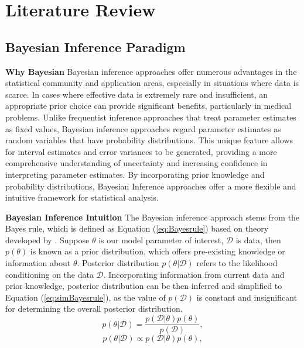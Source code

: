 \chapter{Literature Review}
\label{Chapter2}

\section{Bayesian Inference Paradigm}
\label{bayeisanP}
\textbf{Why Bayesian}
Bayesian inference approaches offer numerous advantages in the statistical community and application areas, especially in situations where data is scarce. In cases where effective data is extremely rare and insufficient, an appropriate prior choice can provide significant benefits, particularly in medical problems. Unlike frequentist inference approaches that treat parameter estimates as fixed values, Bayesian inference approaches regard parameter estimates as random variables that have probability distributions. This unique feature allows for interval estimates and error variances to be generated, providing a more comprehensive understanding of uncertainty and increasing confidence in interpreting parameter estimates. By incorporating prior knowledge and probability distributions, Bayesian Inference approaches offer a more flexible and intuitive framework for statistical analysis.

\textbf{Bayesian Inference Intuition}
The Bayesian inference approach stems from the Bayes rule, which is defined as Equation (\ref{eq:Bayesrule}) based on theory developed by \cite{Beech1959}. Suppose $\theta$ is our model parameter of interest, $\mathcal{D}$ is data, then $p(\theta)$ is known as a prior distribution, which offers pre-existing knowledge or information about $\theta$. Posterior distribution $p(\theta|\mathcal{D})$ refers to the likelihood conditioning on the data $\mathcal{D}$.
Incorporating information from current data and prior knowledge, posterior distribution can be then inferred and simplified to Equation (\ref{eq:simBayesrule}), as the value of $p(\mathcal{D})$ is constant and insignificant for determining the overall posterior distribution. 
\begin{equation}
	p(\theta|\mathcal{D}) = \frac{p(\mathcal{D}|\theta)p(\theta)}{p(\mathcal{D})},
	\label{eq:Bayesrule}
\end{equation}
\begin{equation}
	p(\theta|\mathcal{D}) \propto p(\mathcal{D}|\theta)p(\theta),
	\label{eq:simBayesrule}
\end{equation}
